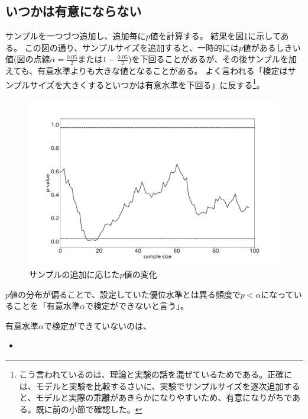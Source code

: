 \subsection{いつかは有意にならない}
サンプルを一つづつ追加し、追加毎に$p$値を計算する。
結果を図\ref{fig:time_series_p_value}に示してある。
この図の通り、サンプルサイズを追加すると、一時的には$p$値があるしきい値(図の点線$\alpha=\frac{0.05}{2}$または$1-\frac{0.05}{2}$)を下回ることがあるが、その後サンプルを加えても、有意水準よりも大きな値となることがある。
よく言われる「検定はサンプルサイズを大きくするといつかは有意水準を下回る」に反する\footnote{こう言われているのは、理論と実験の話を混ぜているためである。正確には、モデルと実験を比較するさいに、実験でサンプルサイズを逐次追加すると、モデルと実際の乖離があきらかになりやすいため、有意になりがちである。既に前の小節で確認した。}。

\begin{figure}
  \begin{center}
    \includegraphics[width=15cm]{./image/04_/recurssive_test.pdf}
    \caption{サンプルの追加に応じた$p$値の変化}
        \label{fig:time_series_p_value}
    \end{center}
\end{figure}




\begin{defi}
  $p$値の分布が偏ることで、設定していた優位水準とは異る頻度で$p<\alpha$になっていることを「有意水準$\alpha$で検定ができないと言う」。
\end{defi}

有意水準$\alpha$で検定ができていないのは、
\begin{itemize}
  \item 
\end{itemize}
\fi

